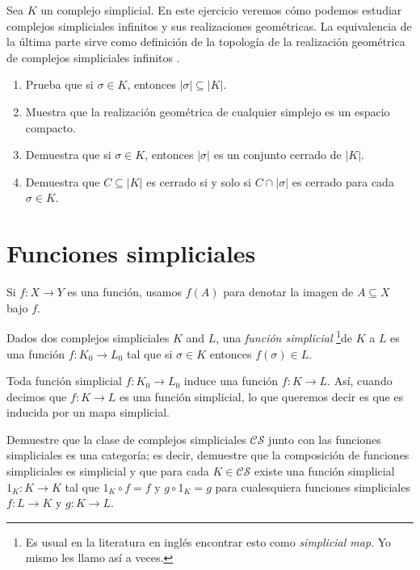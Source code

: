 \documentclass{standalone}
\begin{document}
	\begin{exercise}\label{rem:geom_realization_colimit}
		Sea $K$ un complejo simplicial. En este ejercicio veremos cómo podemos estudiar complejos simpliciales infinitos y sus realizaciones geométricas. La equivalencia de la última parte sirve como definición de la topología de la realización geométrica de complejos simpliciales infinitos \cite[p. 8]{munkres:1984:algebraic:topology}.
		\begin{enumerate}
			\item Prueba que si $\sigma\in K$, entonces $|\sigma|\subseteq |K|$.
			\item Muestra que la realización geométrica de cualquier simplejo es un espacio compacto.
			\item Demuestra que si $\sigma\in K$, entonces $|\sigma|$ es un conjunto cerrado de $|K|$.
			\item Demuestra que $C\subseteq|K|$ es cerrado si y solo si $C\cap|\sigma|$ es cerrado para cada $\sigma\in K$.
		\end{enumerate}
	\end{exercise}
	
	\section{Funciones simpliciales}
	\noindent Si $f\colon X\rightarrow Y$ es una función, usamos $f(A)$ para denotar la imagen de $A\subseteq X$ bajo $f$.
	\begin{definition}\label{def:simplicial_map}
		Dados dos complejos simpliciales $K$ and $L$, una \emph{función simplicial} \footnote{Es usual en la literatura en inglés encontrar esto como \emph{simplicial map}. Yo mismo les llamo así a veces.}de $K$ a $L$ es una función $f\colon K_{0}\rightarrow L_{0}$ tal que si $\sigma\in K$ entonces $f(\sigma)\in L$.
	\end{definition}
	\begin{remark}
		Toda función simplicial $f\colon K_{0}\rightarrow L_{0}$ induce una función $f\colon K\rightarrow L$. Así, cuando decimos que $f\colon K\rightarrow L$ es una función simplicial, lo que queremos decir es que es inducida por un mapa simplicial. 
	\end{remark}
	
	\begin{exercise}
		Demuestre que la clase de complejos simpliciales $\mathcal{CS}$ junto con las funciones simpliciales es una categoría; es decir, demuestre que la composición de funciones simpliciales es simplicial y que para cada $K\in\mathcal{CS}$ existe una función simplicial $1_{K} \colon K\rightarrow K$ tal que $1_{K}\circ f = f$ y $g\circ 1_{K} = g$ para cualesquiera funciones simpliciales $f\colon L\rightarrow K$ y $g\colon K\rightarrow L$.
	\end{exercise}
	
\end{document}
